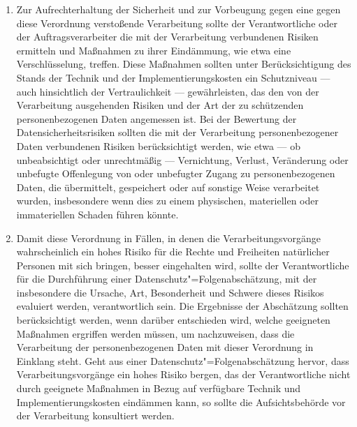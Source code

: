 \begin{enumerate}

   \item Zur Aufrechterhaltung der Sicherheit und zur Vorbeugung gegen eine gegen diese Verordnung verstoßende
    Verarbeitung sollte der Verantwortliche oder der Auftragsverarbeiter die mit der Verarbeitung verbundenen Risiken
    ermitteln und Maßnahmen zu ihrer Eindämmung, wie etwa eine Verschlüsselung, treffen. Diese Maßnahmen sollten unter
    Berücksichtigung des Stands der Technik und der Implementierungskosten ein Schutzniveau — auch hinsichtlich der
    Vertraulichkeit — gewährleisten, das den von der Verarbeitung ausgehenden Risiken und der Art der zu schützenden
    personenbezogenen Daten angemessen ist. Bei der Bewertung der Datensicherheitsrisiken sollten die mit der
    Verarbeitung personenbezogener Daten verbundenen Risiken berücksichtigt werden, wie etwa — ob unbeabsichtigt oder
    unrechtmäßig — Vernichtung, Verlust, Veränderung oder unbefugte Offenlegung von oder unbefugter Zugang zu
    personenbezogenen Daten, die übermittelt, gespeichert oder auf sonstige Weise verarbeitet wurden, insbesondere wenn
    dies zu einem physischen, materiellen oder immateriellen Schaden führen könnte.%
   \label{itm:eg-83}
   

   \item Damit diese Verordnung in Fällen, in denen die Verarbeitungsvorgänge wahrscheinlich ein hohes Risiko für die
    Rechte und Freiheiten natürlicher Personen mit sich bringen, besser eingehalten wird, sollte der Verantwortliche
    für die Durchführung einer Datenschutz"=Folgenabschätzung, mit der insbesondere die Ursache, Art, Besonderheit und
    Schwere dieses Risikos evaluiert werden, verantwortlich sein. Die Ergebnisse der Abschätzung sollten berücksichtigt
    werden, wenn darüber entschieden wird, welche geeigneten Maßnahmen ergriffen werden müssen, um nachzuweisen, dass
    die Verarbeitung der personenbezogenen Daten mit dieser Verordnung in Einklang steht. Geht aus einer
    Datenschutz"=Folgenabschätzung hervor, dass Verarbeitungsvorgänge ein hohes Risiko bergen, das der Verantwortliche
    nicht durch geeignete Maßnahmen in Bezug auf verfügbare Technik und Implementierungskosten eindämmen kann, so
    sollte die Aufsichtsbehörde vor der Verarbeitung konsultiert werden.%
   \label{itm:eg-84}
   


\end{enumerate}
